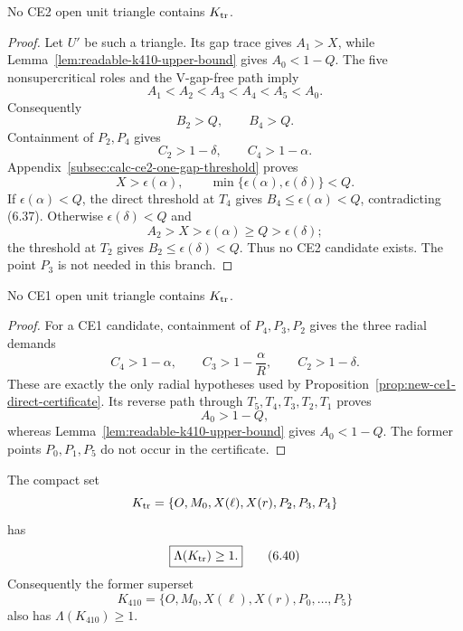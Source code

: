 

\begin{proposition}
\label{prop:readable-k410-ce2}
No CE2 open unit triangle contains $K_{\rm tr}$.
\end{proposition}

\begin{proof}
Let $U'$ be such a triangle.  Its gap trace gives $A_1>X$, while
Lemma~\ref{lem:readable-k410-upper-bound} gives $A_0<1-Q$.
The five nonsupercritical roles and the V-gap-free path imply
\[
 A_1<A_2<A_3<A_4<A_5<A_0.
\]
Consequently
\[
 B_2>Q,\qquad B_4>Q.
 \tag{6.37}
\]
Containment of $P_2,P_4$ gives
\[
 C_2>1-\delta,\qquad C_4>1-\alpha.
 \tag{6.38}
\]
Appendix~\ref{subsec:calc-ce2-one-gap-threshold} proves
\[
 X>\epsilon(\alpha),
 \qquad
 \min\{\epsilon(\alpha),\epsilon(\delta)\}<Q.
 \tag{6.39}
\]
If $\epsilon(\alpha)<Q$, the direct threshold at $T_4$ gives
$B_4\le\epsilon(\alpha)<Q$, contradicting (6.37).  Otherwise
$\epsilon(\delta)<Q$ and
\[
 A_2>X>\epsilon(\alpha)\ge Q>\epsilon(\delta);
\]
the threshold at $T_2$ gives $B_2\le\epsilon(\delta)<Q$.  Thus no CE2
candidate exists.  The point $P_3$ is not needed in this branch.
\end{proof}

\begin{proposition}
\label{prop:readable-k410-ce1}
No CE1 open unit triangle contains $K_{\rm tr}$.
\end{proposition}



\begin{proof}
For a CE1 candidate, containment of $P_4,P_3,P_2$ gives the three radial
demands
\[
 C_4>1-\alpha,\qquad
 C_3>1-\frac{\alpha}{R},\qquad
 C_2>1-\delta.
\]
These are exactly the only radial hypotheses used by
Proposition~\ref{prop:new-ce1-direct-certificate}.  Its reverse path through
$T_5,T_4,T_3,T_2,T_1$ proves
\[
 A_0>1-Q,
\]
whereas Lemma~\ref{lem:readable-k410-upper-bound} gives $A_0<1-Q$.
The former points $P_0,P_1,P_5$ do not occur in the certificate.
\end{proof}

\begin{proposition}
\label{prop:new-nplus-one-all-vd0}
The compact set
\[
 K_{\rm tr}
 =
 \{O,M_0,X(\ell),X(r),P_2,P_3,P_4\}
\]
has
\[
 \boxed{\Lambda(K_{\rm tr})\ge1.}
 \tag{6.40}
\]
Consequently the former superset
\[
 K_{410}=\{O,M_0,X(\ell),X(r),P_0,\ldots,P_5\}
\]
also has $\Lambda(K_{410})\ge1$.
\end{proposition}

